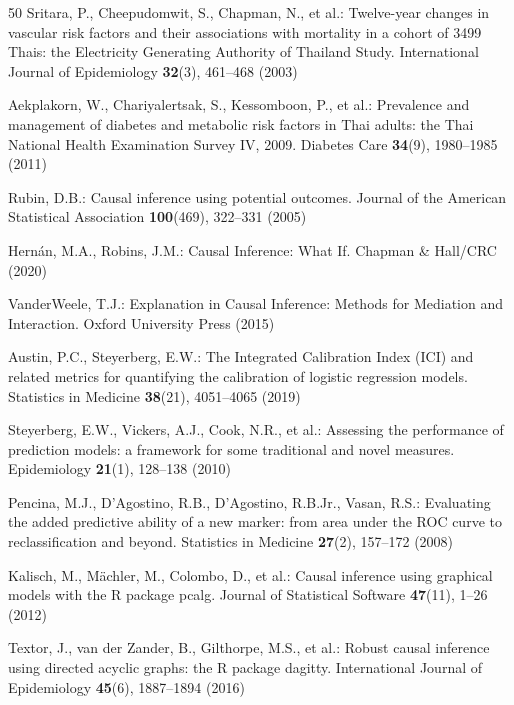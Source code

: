 \documentclass[runningheads]{llncs}
\begin{document}
\begin{thebibliography}{50}
Sritara, P., Cheepudomwit, S., Chapman, N., et al.:
Twelve-year changes in vascular risk factors and their associations
with mortality in a cohort of 3499 Thais: the Electricity Generating
Authority of Thailand Study.
International Journal of Epidemiology \textbf{32}(3), 461--468 (2003)

Aekplakorn, W., Chariyalertsak, S., Kessomboon, P., et al.:
Prevalence and management of diabetes and metabolic risk factors in
Thai adults: the Thai National Health Examination Survey IV, 2009.
Diabetes Care \textbf{34}(9), 1980--1985 (2011)

Rubin, D.B.:
Causal inference using potential outcomes.
Journal of the American Statistical Association \textbf{100}(469),
322--331 (2005)

Hern\'{a}n, M.A., Robins, J.M.:
Causal Inference: What If.
Chapman \& Hall/CRC (2020)

VanderWeele, T.J.:
Explanation in Causal Inference: Methods for Mediation and
Interaction.
Oxford University Press (2015)

Austin, P.C., Steyerberg, E.W.:
The Integrated Calibration Index (ICI) and related metrics for
quantifying the calibration of logistic regression models.
Statistics in Medicine \textbf{38}(21), 4051--4065 (2019)

Steyerberg, E.W., Vickers, A.J., Cook, N.R., et al.:
Assessing the performance of prediction models: a framework for
some traditional and novel measures.
Epidemiology \textbf{21}(1), 128--138 (2010)

Pencina, M.J., D'Agostino, R.B., D'Agostino, R.B.Jr., Vasan, R.S.:
Evaluating the added predictive ability of a new marker: from area
under the ROC curve to reclassification and beyond.
Statistics in Medicine \textbf{27}(2), 157--172 (2008)

Kalisch, M., M\"{a}chler, M., Colombo, D., et al.:
Causal inference using graphical models with the R package pcalg.
Journal of Statistical Software \textbf{47}(11), 1--26 (2012)

Textor, J., van der Zander, B., Gilthorpe, M.S., et al.:
Robust causal inference using directed acyclic graphs: the R
package dagitty.
International Journal of Epidemiology \textbf{45}(6), 1887--1894
(2016)


\end{thebibliography}
\end{document}
